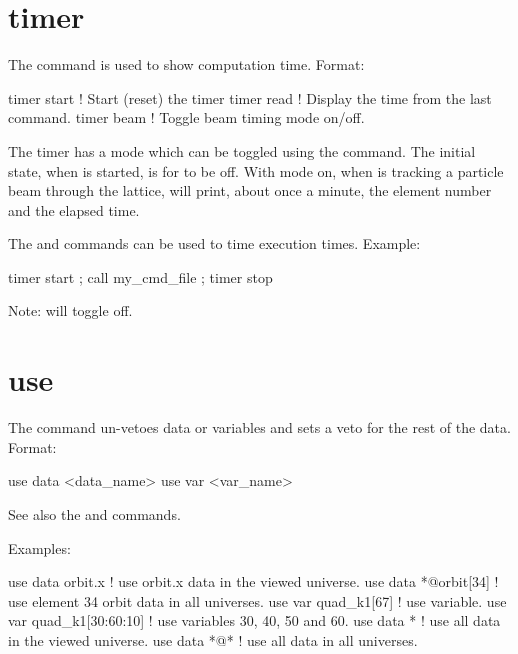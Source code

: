 {{{%
\section{timer}
\label{s:timer}

The  command is used to show computation time. Format:
\begin{example}
  timer start      ! Start (reset) the timer
  timer read       ! Display the time from the last  command.    
  timer beam       ! Toggle beam timing mode on/off.
\end{example}
The timer has a  mode which can be toggled using the
 command. The initial state, when \tao is started, is for
 to be off. With  mode on, when \tao
is tracking a particle beam through the lattice, \tao will print,
about once a minute, the element number and the elapsed time.

The  and  commands can
be used to time execution times. Example:
\begin{example}
  timer start ; call my_cmd_file ; timer stop
\end{example}

Note:  will toggle  off.

\section{use}
\label{s:use}

The  command un-vetoes data or variables and sets a veto for
the rest of the data. Format:
\begin{example}
  use data  <data_name>
  use var <var_name>
\end{example}

\vskip 0.2in 

See also the  and  commands.

Examples:
\begin{example}
  use data orbit.x             ! use orbit.x data in the viewed universe.
  use data *@orbit[34]         ! use element 34 orbit data in all universes.
  use var quad_k1[67]          ! use variable.
  use var quad_k1[30:60:10]    ! use variables 30, 40, 50 and 60.
  use data *                   ! use all data in the viewed universe.
  use data *@*                 ! use all data in all universes.
\end{example}


}}}
